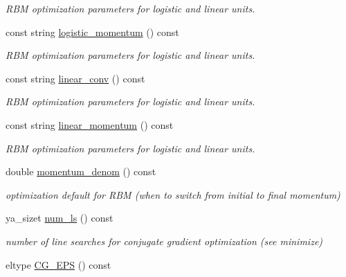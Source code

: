 \begin{CompactItemize}
\begin{CompactList}\small\item\em RBM optimization parameters for logistic and linear units. \item\end{CompactList}\item 
\hypertarget{class_y_a_a_t_e_reduce_a27}{
const string \hyperlink{class_y_a_a_t_e_reduce_a27}{logistic\_\-momentum} () const }
\label{class_y_a_a_t_e_reduce_a27}

\begin{CompactList}\small\item\em RBM optimization parameters for logistic and linear units. \item\end{CompactList}\item 
\hypertarget{class_y_a_a_t_e_reduce_a28}{
const string \hyperlink{class_y_a_a_t_e_reduce_a28}{linear\_\-conv} () const }
\label{class_y_a_a_t_e_reduce_a28}

\begin{CompactList}\small\item\em RBM optimization parameters for logistic and linear units. \item\end{CompactList}\item 
\hypertarget{class_y_a_a_t_e_reduce_a29}{
const string \hyperlink{class_y_a_a_t_e_reduce_a29}{linear\_\-momentum} () const }
\label{class_y_a_a_t_e_reduce_a29}

\begin{CompactList}\small\item\em RBM optimization parameters for logistic and linear units. \item\end{CompactList}\item 
double \hyperlink{class_y_a_a_t_e_reduce_a30}{momentum\_\-denom} () const 
\begin{CompactList}\small\item\em optimization default for RBM (when to switch from initial to final momentum) \item\end{CompactList}\item 
ya\_\-sizet \hyperlink{class_y_a_a_t_e_reduce_a31}{num\_\-ls} () const 
\begin{CompactList}\small\item\em number of line searches for conjugate gradient optimization (see minimize) \item\end{CompactList}\item 
\hypertarget{class_y_a_a_t_e_reduce_a32}{
eltype \hyperlink{class_y_a_a_t_e_reduce_a32}{CG\_\-EPS} () const }
\label{class_y_a_a_t_e_reduce_a32}


\end{CompactItemize}
